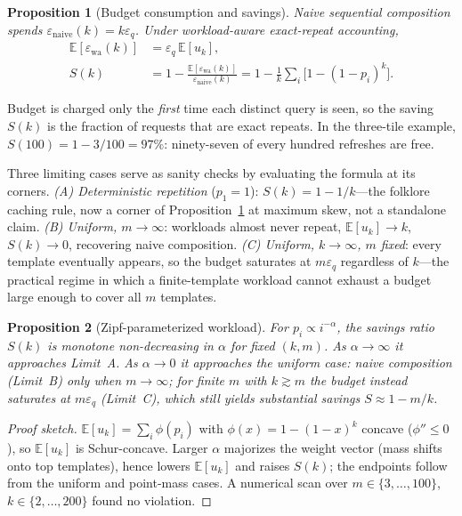 \documentclass[sigconf,nonacm]{acmart}
\newcommand{\eps}{\varepsilon}
\newcommand{\E}{\mathbb{E}}
\newtheorem{prop}{Proposition}
\begin{document}
\begin{prop}[Budget consumption and savings]
\label{prop:savings}
Naive sequential composition spends $\eps_{\mathrm{naive}}(k)=k\eps_q$. Under workload-aware exact-repeat accounting,
\begin{align*}
\E[\eps_{\mathrm{wa}}(k)]&=\eps_q\,\E[u_k],\\
S(k)&=1-\frac{\E[\eps_{\mathrm{wa}}(k)]}{\eps_{\mathrm{naive}}(k)}=1-\frac{1}{k}\sum_i\bigl[1-(1-p_i)^k\bigr].
\end{align*}
\end{prop}

\noindent Budget is charged only the \emph{first} time each distinct query is seen, so the saving $S(k)$ is the fraction of requests that are exact repeats. In the three-tile example, $S(100)=1-3/100=97\%$: ninety-seven of every hundred refreshes are free.

\noindent Three limiting cases serve as sanity checks by evaluating the formula at its corners. \emph{(A) Deterministic repetition} ($p_1{=}1$): $S(k)=1-1/k$---the folklore caching rule, now a corner of Proposition~\ref{prop:savings} at maximum skew, not a standalone claim. \emph{(B) Uniform, $m\to\infty$}: workloads almost never repeat, $\E[u_k]\to k$, $S(k)\to0$, recovering naive composition. \emph{(C) Uniform, $k\to\infty$, $m$ fixed}: every template eventually appears, so the budget saturates at $m\eps_q$ regardless of $k$---the practical regime in which a finite-template workload cannot exhaust a budget large enough to cover all $m$ templates.

\begin{prop}[Zipf-parameterized workload]
\label{prop:zipf}
For $p_i\propto i^{-\alpha}$, the savings ratio $S(k)$ is monotone non-decreasing in $\alpha$ for fixed $(k,m)$. As $\alpha\to\infty$ it approaches Limit~A. As $\alpha\to0$ it approaches the uniform case: naive composition (Limit~B) \emph{only when $m\to\infty$}; for finite $m$ with $k\gtrsim m$ the budget instead saturates at $m\eps_q$ (Limit~C), which still yields substantial savings $S\approx1-m/k$.
\end{prop}
\begin{proof}[Proof sketch]
$\E[u_k]=\sum_i\phi(p_i)$ with $\phi(x)=1-(1-x)^k$ concave ($\phi''\le0$), so $\E[u_k]$ is Schur-concave. Larger $\alpha$ majorizes the weight vector (mass shifts onto top templates), hence lowers $\E[u_k]$ and raises $S(k)$; the endpoints follow from the uniform and point-mass cases. A numerical scan over $m\in\{3,\dots,100\}$, $k\in\{2,\dots,200\}$ found no violation.
\end{proof}
\end{document}
